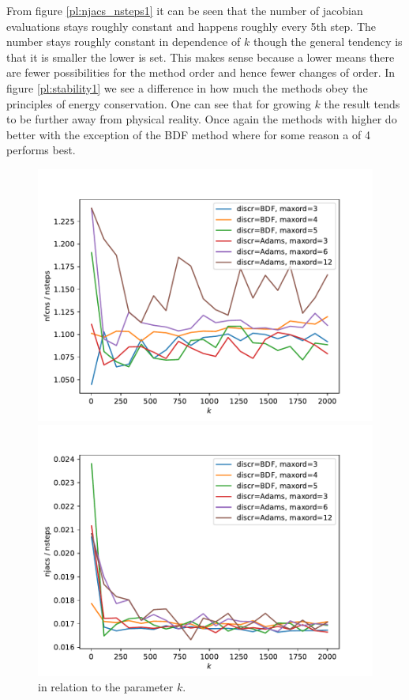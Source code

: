 \documentclass{report}
\newcounter{constant}
\begin{document}
From figure \ref{pl:njacs_nsteps1} it can be seen that the number of jacobian evaluations stays roughly constant and happens roughly every 5th step. The number  stays roughly constant in dependence of $k$ though the general tendency is that it is smaller the lower  is set. This makes sense because a lower  means there are fewer possibilities for the method order and hence fewer changes of order. In figure \ref{pl:stability1} we see a difference in how much the methods obey the principles of energy conservation. One can see that for growing $k$ the result tends to be further away from physical reality. Once again the methods with higher  do better with the exception of the BDF method where for some reason a  of 4 performs best.


\begin{figure}[h]
\centering
\begin{minipage}[b]{0.45\textwidth}
\centering
\includegraphics[width=\textwidth]{../Plots/Task4/Figure_210}
\caption{ in relation to the parameter $k$.}
\label{pl:nfcns_nsteps1}
\end{minipage}
\hfill
\begin{minipage}[b]{0.45\textwidth}
\centering
\includegraphics[width=\textwidth]{../Plots/Task4/Figure_211}

\end{minipage}
\end{figure}
\end{document}
